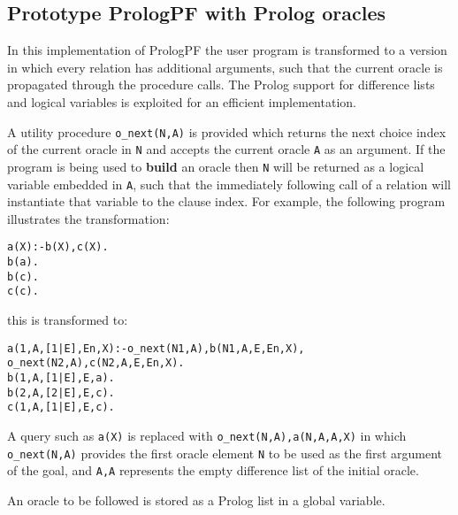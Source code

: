 \subsection{Prototype PrologPF with Prolog oracles}

In this implementation of PrologPF the user program is transformed to a 
version in which every relation has additional arguments, such that the
current oracle is propagated through the procedure calls.  The Prolog
support for difference lists and logical variables is exploited for an
efficient implementation.

A utility procedure \texttt{o\_{}next(N,A)} is provided which returns the next
choice index of the current oracle in \texttt{N} and accepts the current oracle
\texttt{A} as an argument.  If the program is being used to \textbf{build} an
oracle then \texttt{N} will be returned as a logical 
variable embedded in \texttt{A}, such
that the immediately following call of a relation will instantiate that variable
to the clause index.
For example, the following program illustrates the transformation:
\begin{alltt}
  a(X) :- b(X), c(X).\vspace{2mm}
  b(a).
  b(c).\vspace{2mm}
  c(c).
\end{alltt}
this is transformed to:
\begin{alltt}
  a(1,A,[1|E],En,X) :- o_next(N1,A), b(N1,A,E,En,X),
                       o_next(N2,A), c(N2,A,E,En,X).\vspace{2mm}
  b(1,A,[1|E],E,a).
  b(2,A,[2|E],E,c).\vspace{2mm}
  c(1,A,[1|E],E,c).
\end{alltt}

A query such as \texttt{a(X)} is replaced with \texttt{o\_{}next(N,A),a(N,A,A,X)} in
which \texttt{o\_{}next(N,A)} provides the first oracle element \texttt{N}
to be used as the first argument of the goal, and \texttt{A,A} represents the
empty difference list of the initial oracle.

An oracle to be followed is stored as a Prolog list in a global variable.

